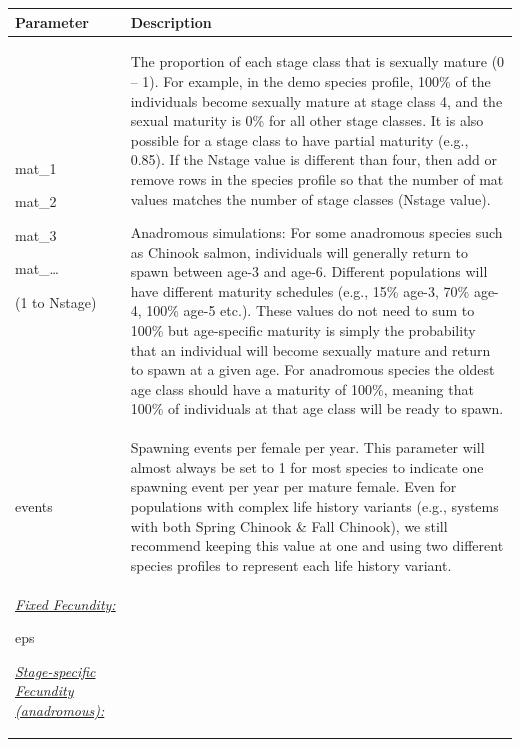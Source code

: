 \documentclass[
  letterpaper,
  DIV=11,
  numbers=noendperiod]{scrreprt}
\begin{document}
\begin{longtable}[]{@{}
  >{\raggedright\arraybackslash}p{}
  >{\raggedright\arraybackslash}p{}@{}}
\toprule\noalign{}
\begin{minipage}[b]{\linewidth}\raggedright
Parameter
\end{minipage} & \begin{minipage}[b]{\linewidth}\raggedright
Description
\end{minipage} \\
\midrule\noalign{}
\endhead
\bottomrule\noalign{}
\endlastfoot
mat\_1

mat\_2

mat\_3

mat\_\ldots{}

(1 to Nstage) & The proportion of each stage class that is sexually
mature (0 -- 1). For example, in the demo species profile, 100\% of the
individuals become sexually mature at stage class 4, and the sexual
maturity is 0\% for all other stage classes. It is also possible for a
stage class to have partial maturity (e.g., 0.85). If the Nstage value
is different than four, then add or remove rows in the species profile
so that the number of mat values matches the number of stage classes
(Nstage value).

Anadromous simulations: For some anadromous species such as Chinook
salmon, individuals will generally return to spawn between age-3 and
age-6. Different populations will have different maturity schedules
(e.g., 15\% age-3, 70\% age-4, 100\% age-5 etc.). These values do not
need to sum to 100\% but age-specific maturity is simply the probability
that an individual will become sexually mature and return to spawn at a
given age. For anadromous species the oldest age class should have a
maturity of 100\%, meaning that 100\% of individuals at that age class
will be ready to spawn. \\
events & Spawning events per female per year. This parameter will almost
always be set to 1 for most species to indicate one spawning event per
year per mature female. Even for populations with complex life history
variants (e.g., systems with both Spring Chinook \& Fall Chinook), we
still recommend keeping this value at one and using two different
species profiles to represent each life history variant. \\
\ul{\emph{Fixed Fecundity:}}

eps

\ul{\emph{Stage-specific Fecundity (anadromous):}}


\end{longtable}
\end{document}
